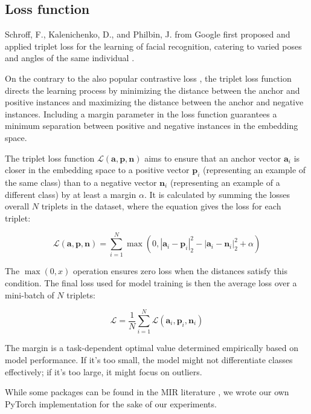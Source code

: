 \subsection{Loss function}

Schroff, F., Kalenichenko, D., and Philbin, J. from Google first proposed and applied triplet loss for the learning of facial recognition, catering to varied poses and angles of the same individual \cite{Schroff2015FaceNet:Clustering}.

On the contrary to the also popular contrastive loss \cite{supercontrast}, the triplet loss function directs the learning process by minimizing the distance between the anchor and positive instances and maximizing the distance between the anchor and negative instances. Including a margin parameter in the loss function guarantees a minimum separation between positive and negative instances in the embedding space.

The triplet loss function $\mathcal{L}(\mathbf{a}, \mathbf{p}, \mathbf{n})$ aims to ensure that an anchor vector $\mathbf{a}_i$ is closer in the embedding space to a positive vector $\mathbf{p}_i$ (representing an example of the same class) than to a negative vector $\mathbf{n}_i$ (representing an example of a different class) by at least a margin $\alpha$. It is calculated by summing the losses overall $N$ triplets in the dataset, where the equation gives the loss for each triplet:

\begin{equation}
\mathcal{L}(\mathbf{a}, \mathbf{p}, \mathbf{n}) = \sum_{i=1}^{N} \max \left(0, \left| \mathbf{a}_i - \mathbf{p}_i \right|_2^2 - \left| \mathbf{a}_i - \mathbf{n}_i \right|_2^2 + \alpha \right)
\end{equation}

The $\max(0, x)$ operation ensures zero loss when the distances satisfy this condition. The final loss used for model training is then the average loss over a mini-batch of $N$ triplets:

\begin{equation}
\mathcal{L} = \frac{1}{N} \sum_{i=1}^{N} \mathcal{L}(\mathbf{a}_i, \mathbf{p}_i, \mathbf{n}_i)
\end{equation}

The margin is a task-dependent optimal value determined empirically based on model performance. If it's too small, the model might not differentiate classes effectively; if it's too large, it might focus on outliers.

While some packages can be found in the MIR literature \cite{auraloss}, we wrote our own PyTorch \cite{Paszke2019PyTorch:Library} implementation for the sake of our experiments.

